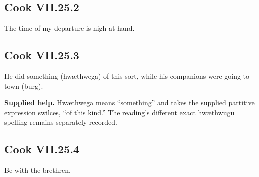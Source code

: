 \par\begin{minipage}{\linewidth}\raggedright
\subsection*{Cook VII.25.2}

The time of my departure is nigh at hand.

\end{minipage}\par\addvspace{4pt}

\par\begin{minipage}{\linewidth}\raggedright
\subsection*{Cook VII.25.3}

He did something (hwæthwega) of this sort, while his companions were going to town (burg).

\end{minipage}\par\addvspace{4pt}

\textbf{Supplied help.} Hwæthwega means “something” and takes the supplied partitive expression swilces, “of this kind.” The reading’s different exact hwæthwugu spelling remains separately recorded.

\par\begin{minipage}{\linewidth}\raggedright
\subsection*{Cook VII.25.4}

Be with the brethren.

\end{minipage}\par\addvspace{4pt}

